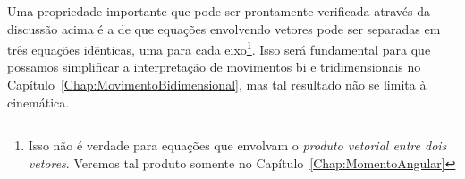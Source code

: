 Uma propriedade importante que pode ser prontamente verificada através da discussão acima é a de que equações envolvendo vetores pode ser separadas em três equações idênticas, uma para cada eixo\footnote{Isso não é verdade para equações que envolvam o \emph{produto vetorial entre dois vetores}. Veremos tal produto somente no Capítulo~\ref{Chap:MomentoAngular}}. Isso será fundamental para que possamos simplificar a interpretação de movimentos bi e tridimensionais no Capítulo~\ref{Chap:MovimentoBidimensional}, mas tal resultado não se limita à cinemática.


